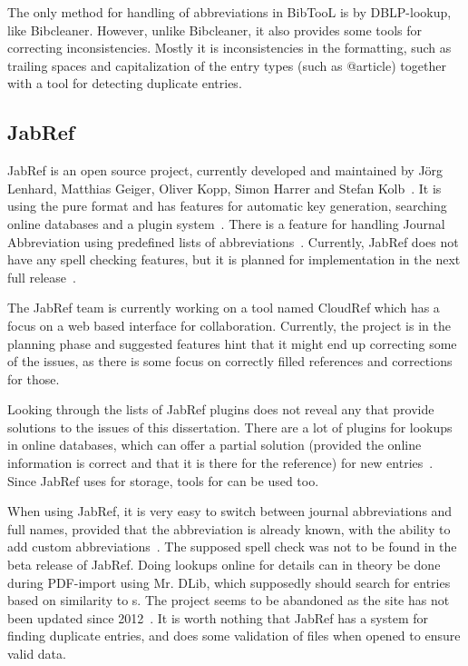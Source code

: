 The only method for handling of abbreviations in BibTooL is by
DBLP-lookup, like Bibcleaner.  However, unlike Bibcleaner, it also
provides some tools for correcting inconsistencies.  Mostly it is
inconsistencies in the formatting, such as trailing spaces and
capitalization of the entry types (such as @article) together with a
tool for detecting duplicate entries.

\subsection{JabRef}
JabRef is an open source project, currently developed and maintained
by Jörg Lenhard, Matthias Geiger, Oliver Kopp, Simon Harrer and Stefan
Kolb~\cite{jabref_developers}.  It is using the pure {\bibtex} format
and has features for automatic key generation, searching online
databases and a plugin system~\cite{jabref_features}.  There is a
feature for handling Journal Abbreviation using predefined lists of
abbreviations~\cite{jabref_abbreviations}.  Currently, JabRef does not
have any spell checking features, but it is planned for implementation
in the next full release~\cite{jabref_spellchecker}.

The JabRef team is currently working on a tool named CloudRef which
has a focus on a web based interface for collaboration.  Currently,
the project is in the planning phase and suggested features hint that
it might end up correcting some of the issues, as there is some focus
on correctly filled {\bibtex} references and corrections for those.

Looking through the lists of JabRef plugins does not reveal any that
provide solutions to the issues of this dissertation.  There are a lot
of plugins for lookups in online databases, which can offer a partial
solution (provided the online information is correct and that it is
there for the reference) for new entries~\cite{jabref_resources}.
Since JabRef uses {\bibtex} for storage, tools for {\bibtex} can be
used too.

When using JabRef, it is very easy to switch between journal
abbreviations and full names, provided that the abbreviation is
already known, with the ability to add custom
abbreviations~\cite{jabref_abbreviations}.  The supposed spell check
was not to be found in the beta release of JabRef.  Doing lookups
online for details can in theory be done during PDF-import using
Mr. DLib, which supposedly should search for entries based on
similarity to s.  The project seems to be abandoned as the
site has not been updated since
2012~\cite{jabref_mrdlib,jabref_mrdlib_notice}.  It is worth nothing
that JabRef has a system for finding duplicate entries, and does some
validation of {\bibtex} files when opened to ensure valid data.

